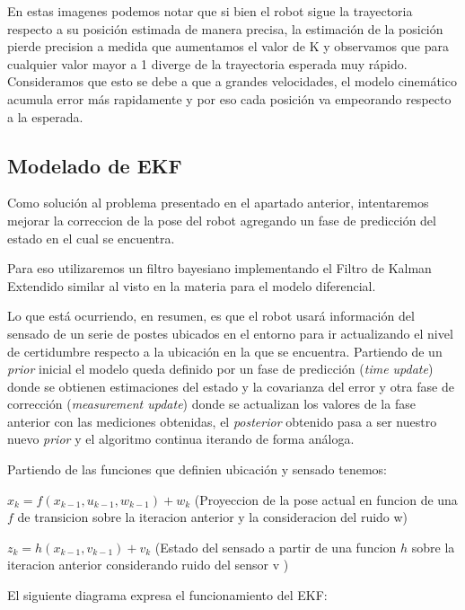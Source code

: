 

En estas imagenes podemos notar que si bien el robot sigue la trayectoria respecto a su posición estimada de manera precisa, la estimación de la posición pierde precision a medida que aumentamos el valor de K y observamos que para cualquier valor mayor a 1 diverge de la trayectoria esperada muy rápido. Consideramos que esto se debe a que a grandes velocidades, el modelo cinemático acumula error más rapidamente y por eso cada posición va empeorando respecto a la esperada.

\subsection{Modelado de EKF}

Como solución al problema presentado en el apartado anterior, intentaremos mejorar la correccion de la pose del robot agregando un fase de predicción del estado en el cual se encuentra.

Para eso utilizaremos un filtro bayesiano implementando el Filtro de Kalman Extendido similar al visto en la materia para el modelo diferencial.

Lo que está ocurriendo, en resumen, es que el robot usará información del sensado de un serie de postes ubicados en el entorno para ir actualizando el nivel de certidumbre respecto a la ubicación en la que se encuentra. Partiendo de un \textit{prior} inicial el modelo queda definido por un fase de predicción (\textit{time update}) donde se obtienen estimaciones del estado y la covarianza del error y otra fase de corrección (\textit{measurement update}) donde se actualizan los valores de la fase anterior con las mediciones obtenidas, el \textit{posterior} obtenido pasa a ser nuestro nuevo \textit{prior} y el algoritmo continua iterando de forma análoga.


Partiendo de las funciones que definien ubicación y sensado tenemos:

$x_k = f(x_{k-1}, u_{k-1},w_{k-1}) + w_k$  (Proyeccion de la pose actual en funcion de una $f$ de transicion sobre la iteracion anterior y la consideracion del ruido w)

$z_k = h(x_{k-1},v_{k-1}) + v_k$   (Estado del sensado a partir de una funcion $h$ sobre la iteracion anterior considerando ruido del sensor v )

El siguiente diagrama expresa el funcionamiento del EKF:


